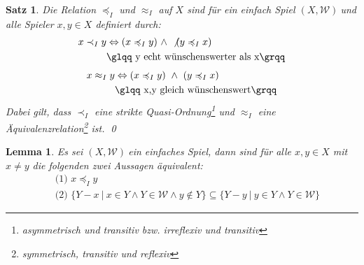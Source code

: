 \documentclass[ngerman]{scrartcl}
\theoremstyle{custom}
\newtheorem{ms}[mdef]{Satz}
\newtheorem{ml}[mdef]{Lemma}
\newcommand{\0}{\mathbf{0}}
\newcommand{\1}{\mathbf{L}}
\newcommand{\sg}{$(X,\mathcal{W})~$}
\newcommand{\W}{\mathcal{W}}
\newcommand{\ww}{\preccurlyeq _{I}}
\begin{document}
\begin{ms}
Die Relation $\ww$ und $\approx_I$ auf $X$ sind f\"ur ein einfach
Spiel \sg und alle Spieler $x,y \in X$ definiert durch:
\begin{align*}
x \prec_I y &\Leftrightarrow (x \ww y) ~\wedge~ \not(y \ww x)\\
& \text{\glqq y echt w\"unschenswerter als x\grqq} 
\end{align*}
\begin{align*}
x \approx_I y &\Leftrightarrow (x \ww y) ~\wedge~ (y \ww x)\\
& \text{\glqq x,y gleich w\"unschenswert\grqq} 
\end{align*}
Dabei gilt, dass $\prec_I$ eine strikte
Quasi-Ordnung\footnote{asymmetrisch und transitiv bzw. irreflexiv und
  transitiv} und $\approx_I$ eine
\"Aquivalenzrelation\footnote{symmetrisch, transitiv und reflexiv}
ist.
\qed
\end{ms}

\begin{ml}
Es sei \sg ein einfaches Spiel, dann sind f\"ur alle $x,y \in X$ mit
$x \not = y$ die folgenden zwei Aussagen \"aquivalent:
\begin{align*}
&\text{ (1) } x \ww y\\
&\text{ (2) } \{Y-x ~\vert~ x \in Y \wedge Y \in \W \wedge y \not \in
Y\} \subseteq \{Y-y ~\vert~ y \in Y \wedge Y \in \W\}
\end{align*}
\end{ml}
\end{document}
